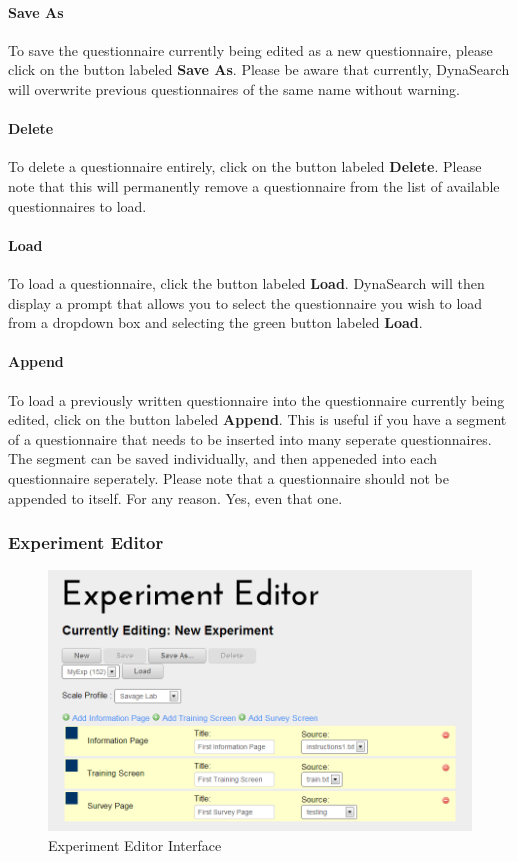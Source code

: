 \documentclass[article]{ij4uq}              %
\begin{document}
\paragraph{Save As}
To save the questionnaire currently being edited as a new questionnaire, please click on the button labeled \textbf{Save As}.  Please be aware that currently, DynaSearch will overwrite previous questionnaires of the same name without warning.

\paragraph{Delete}
To delete a questionnaire entirely, click on the button labeled \textbf{Delete}.  Please note that this will permanently remove a questionnaire from the list of available questionnaires to load.

\paragraph{Load}
To load a questionnaire, click the button labeled \textbf{Load}. DynaSearch will then display a prompt that allows you to select the questionnaire you wish to load from a dropdown box and selecting the green button labeled \textbf{Load}.

\paragraph{Append}
To load a previously written questionnaire into the questionnaire currently being edited, click on the button labeled \textbf{Append}.  This is useful if you have a segment of a questionnaire that needs to be inserted into many seperate questionnaires.  The segment can be saved individually, and then appeneded into each questionnaire seperately.  Please note that a questionnaire should not be appended to itself.  For any reason.  Yes, even that one.

\subsubsection{Experiment Editor}

\begin{figure}[h!]
 \centering
 \includegraphics[width=5.0in]{figures/experiment_editor.png}
 \caption{Experiment Editor Interface}
 \label{fig:eeInterface}
\end{figure}
\FloatBarrier
\end{document}

